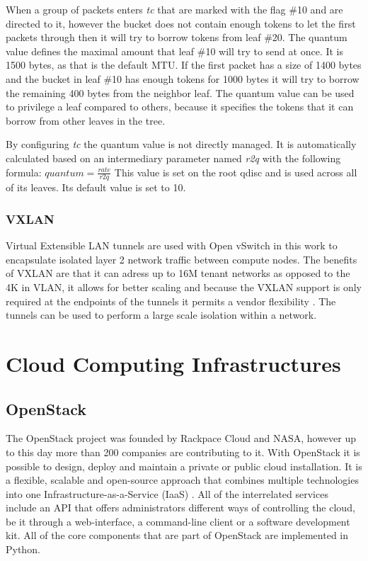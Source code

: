 When a group of packets enters \textit{tc} that are marked with the flag \#10 and are directed to it, however the bucket does not contain enough tokens to let the first packets through then it will try to borrow tokens from leaf \#20. The quantum value defines the maximal amount that leaf \#10 will try to send at once. It is 1500 bytes, as that is the default MTU. If the first packet has a size of 1400 bytes and the bucket in leaf \#10 has enough tokens for 1000 bytes it will try to borrow the remaining 400 bytes from the neighbor leaf. The quantum value can be used to privilege a leaf compared to others, because it specifies the tokens that it can borrow from other leaves in the tree.

By configuring \textit{tc} the quantum value is not directly managed. It is automatically calculated based on an intermediary parameter named \textit{r2q} with the following formula:  $ quantum = \frac{rate}{r2q} $ This value is set on the root qdisc and is used across all of its leaves. Its default value is set to 10.


\subsubsection{VXLAN}

Virtual Extensible LAN tunnels are used with Open vSwitch in this work to encapsulate isolated layer 2 network traffic between compute nodes. The benefits of VXLAN are that it can adress up to 16M tenant networks as opposed to the 4K in VLAN, it allows for better scaling and because the VXLAN support is only required at the endpoints of the tunnels it permits a vendor flexibility \cite{openstack-vxlan}. The tunnels can be used to perform a large scale isolation within a network.


\section{Cloud Computing Infrastructures}


\subsection{OpenStack}

The OpenStack project was founded by Rackpace Cloud and NASA, however up to this day  more than 200 companies are contributing to it.
With OpenStack it is possible to design, deploy and maintain a private or public cloud installation. It is a flexible, scalable and open-source approach that combines multiple technologies into one Infrastructure-as-a-Service (IaaS) \cite{openstack-ops}. All of the interrelated services include an API that offers administrators different ways of controlling the cloud, be it through a web-interface, a command-line client or a software development kit. All of the core components that are part of OpenStack are implemented in Python.



